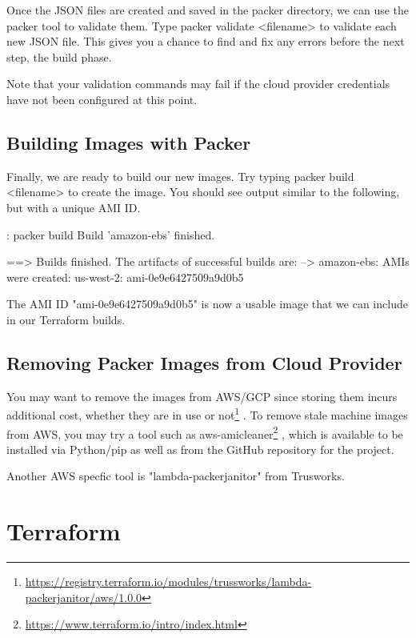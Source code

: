 \justify
Once the JSON files are created and saved in the packer directory, we
can use the packer tool to validate them. Type
packer validate \textless{}filename\textgreater{} to validate each new
JSON file. This gives you a chance to find and fix any errors before the
next step, the build phase.

\justify
Note that your validation commands may fail if the cloud provider
credentials have not been configured at this point.

\subsection{Building Images with Packer}

\justify
Finally, we are ready to build our new images. Try typing
packer build \textless{}filename\textgreater{} to create the image. You
should see output similar to the following, but with a unique AMI ID.

\begin{mybox}{\thetcbcounter: packer build}
Build 'amazon-ebs' finished.

==> Builds finished. The artifacts of successful builds are:
--> amazon-ebs: AMIs were created:
    us-west-2: ami-0e9e6427509a9d0b5
\end{mybox}

\justify
The AMI ID "ami-0e9e6427509a9d0b5" is now a usable image that we can
include in our Terraform builds.

\subsection{Removing Packer Images from Cloud Provider}

\justify
You may want to remove the images from AWS/GCP since storing them incurs
additional cost, whether they are in use or not\footnote{\url{https://registry.terraform.io/modules/trussworks/lambda-packerjanitor/aws/1.0.0}}
.
\justify
To remove stale machine images from AWS, you may try a tool such as
aws-amicleaner\footnote{\url{https://www.terraform.io/intro/index.html}}
, which is available to be installed via Python/pip as well as from the
GitHub repository for the project.

\jusitfy
Another AWS specfic tool is "lambda-packerjanitor" from Trusworks.

\section{Terraform}

